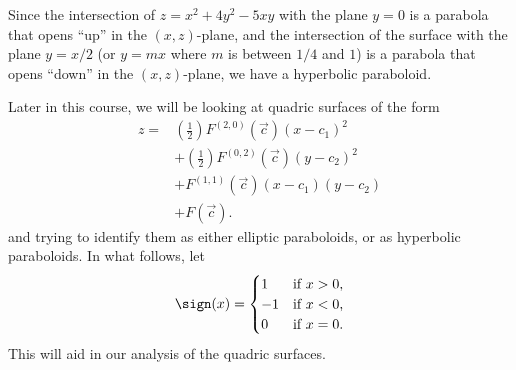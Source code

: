 \documentclass{ximera}
\begin{document}
\begin{example}
\begin{explanation}
\begin{image}
    \end{image}
    Since the intersection of $z=x^2+4y^2-5xy$ with the plane $y=0$ is
    a parabola that opens ``up'' in the $(x,z)$-plane, and the
    intersection of the surface with the plane $y = x/2$ (or $y=mx$
    where $m$ is between $1/4$ and $1$) is a parabola that opens
    ``down'' in the $(x,z)$-plane, we have a hyperbolic paraboloid.
  \end{explanation}
\end{example}

Later in this course, we will be looking at quadric surfaces of the
form
\begin{align*}
  z = &\left(\frac{1}{2}\right)F^{(2,0)}(\vec{c})(x-c_1)^2\\
  &+ \left(\frac{1}{2}\right)F^{(0,2)}(\vec{c})(y-c_2)^2 \\
  &+ F^{(1,1)}(\vec{c}) (x-c_1)(y-c_2)\\
  &+ F(\vec{c}).
\end{align*}
and trying to identify them as either elliptic paraboloids, or as
hyperbolic paraboloids. In what follows, let
\[
\sign(x) =
\begin{cases}
  1  &\text{if $x>0$,}\\
  -1 &\text{if $x<0$,}\\
  0  &\text{if $x=0$.}
\end{cases}
\]
This will aid in our analysis of the quadric surfaces.
\end{document}
